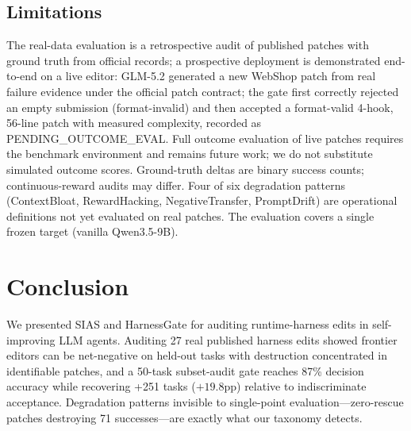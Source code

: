 \documentclass{article}
\begin{document}
\subsection{Limitations}
The real-data evaluation is a retrospective audit of published patches with ground truth from official records; a prospective deployment is demonstrated end-to-end on a live editor: GLM-5.2 generated a new WebShop patch from real failure evidence under the official patch contract; the gate first correctly rejected an empty submission (format-invalid) and then accepted a format-valid 4-hook, 56-line patch with measured complexity, recorded as PENDING\_OUTCOME\_EVAL. Full outcome evaluation of live patches requires the benchmark environment and remains future work; we do not substitute simulated outcome scores. Ground-truth deltas are binary success counts; continuous-reward audits may differ. Four of six degradation patterns (ContextBloat, RewardHacking, NegativeTransfer, PromptDrift) are operational definitions not yet evaluated on real patches. The evaluation covers a single frozen target (vanilla Qwen3.5-9B).

\section{Conclusion}
\label{sec:conclusion}

We presented SIAS and HarnessGate for auditing runtime-harness edits in self-improving LLM agents. Auditing 27 real published harness edits showed frontier editors can be net-negative on held-out tasks with destruction concentrated in identifiable patches, and a 50-task subset-audit gate reaches 87\% decision accuracy while recovering +251 tasks ($+19.8$pp) relative to indiscriminate acceptance. Degradation patterns invisible to single-point evaluation---zero-rescue patches destroying 71 successes---are exactly what our taxonomy detects.



\end{document}
